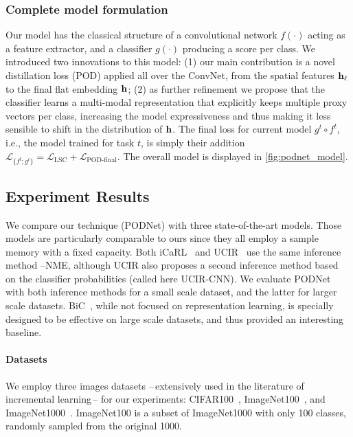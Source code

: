 \subsubsection{Complete model formulation}
\label{sec:podnet_modelsummary}

Our model has the classical structure of a convolutional network $f(\cdot)$ acting as a feature
extractor, and a classifier $g(\cdot)$ producing a score per class. We introduced two innovations to
this model: (1) our main contribution is a novel distillation loss (POD) applied all over the
\ac{ConvNet}, from the spatial features $\mathbf{h}_\ell$ to the final flat embedding $\mathbf{h}$; (2) as further
refinement we propose that the classifier learns a multi-modal representation that explicitly keeps
multiple proxy vectors per class, increasing the model expressiveness and thus making it less
sensible to shift in the distribution of $\mathbf{h}$. The final loss for current model $g^t \circ f^t$,
i.e., the model trained for task $t$, is simply their addition $\mathcal{L}_{\{f^t; g^t\}} =
    \mathcal{L}_\textrm{LSC} + \mathcal{L}_\textrm{POD-final}$. The overall model is displayed in
\autoref{fig:podnet_model}.

\subsection{Experiment Results}
\label{sec:podnet_exp}

We compare our technique (\ac{PODNet}) with three state-of-the-art models. Those models are
particularly comparable to ours since they all employ a sample memory with a fixed capacity. Both
iCaRL~\citep{rebuffi2017icarl} and UCIR~\citep{hou2019ucir} use the same inference method
--\ac{NME}, although UCIR also proposes a second inference method based on the classifier
probabilities (called here UCIR-CNN). We evaluate \ac{PODNet} with both inference methods for a
small scale dataset, and the latter for larger scale datasets. BiC~\citep{wu2019bias_correction},
while not focused on representation learning, is specially designed to be effective on large scale
datasets, and thus provided an interesting baseline.

\paragraph{Datasets} We employ three images datasets --\,extensively used in the literature of
incremental learning\,-- for our experiments: CIFAR100~\citep{krizhevskycifar100},
ImageNet100~\citep{deng2009imagenet,hou2019ucir,wu2019bias_correction}, and
ImageNet1000~\citep{deng2009imagenet}. ImageNet100 is a subset of ImageNet1000 with only 100
classes, randomly sampled from the original 1000.

